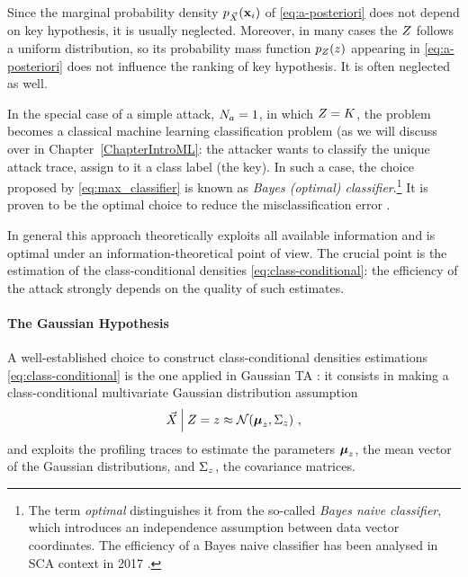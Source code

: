 \begin{remark}Since the marginal probability density $p_{\vec{X}}(\textbf{x}_i)$ of \eqref{eq:a-posteriori} does not depend on key hypothesis, it is usually neglected. Moreover, in many cases the $Z$ follows a uniform distribution, so its probability mass function $p_{Z}(z)$ appearing in \eqref{eq:a-posteriori}  does not influence the ranking of key hypothesis. It is often neglected as well. 
\end{remark}

\begin{remark}
In the special case of a simple attack, \ie $N_a = 1$, in which $Z = K$, the problem becomes a classical machine learning classification problem (as we will discuss over in Chapter~\ref{ChapterIntroML}: the attacker wants to classify the unique attack trace, \ie assign to it a class label (the key). In such a case, the choice proposed by \eqref{eq:max_classifier} is known as \emph{Bayes (optimal) classifier}.\footnote{The term \emph{optimal} distinguishes it from the so-called \emph{Bayes naive classifier}, which introduces an independence assumption between data vector coordinates. The efficiency of a Bayes naive classifier has been analysed in SCA context in 2017 \cite{picek2017template}.} It is proven to be the optimal choice to reduce the misclassification error \cite{christopher2006pattern}.
\end{remark}

In general this approach theoretically exploits all available information and is optimal under an information-theoretical point of view. The crucial point is the estimation of the class-conditional densities \eqref{eq:class-conditional}: the efficiency of the attack strongly depends on the quality of such estimates. 

\paragraph{The Gaussian Hypothesis} A well-established choice to construct class-conditional densities estimations \ref{eq:class-conditional} is the one applied in Gaussian TA \cite{Chari2003}: it consists in making a class-conditional multivariate Gaussian distribution assumption
\begin{equation}\label{eq:gaussian_assumption}
\vec{X}\:\Big\vert\: Z =z \approx \mathcal{N}(\boldsymbol{\mu}_z, \Sigma_z)\mbox{ ,}
\end{equation} 
and exploits the profiling traces to estimate the  parameters $\boldsymbol{\mu}_z$, \ie the mean vector of the Gaussian distributions, and $ \Sigma_z$, \ie the covariance matrices. \\

